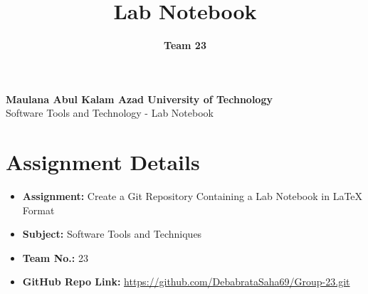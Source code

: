 \documentclass[a4paper,15pt]{article}
\title{\textbf{Lab Notebook}}
\author{\textbf{Team 23}}
\date{}
\begin{document}
\maketitle


\begin{center}
    \Large\textbf{Maulana Abul Kalam Azad University of Technology}\\
    \vspace{0.2cm}
    \large Software Tools and Technology - Lab Notebook
\end{center}

\vspace{1cm}

\section*{Assignment Details}
\begin{itemize}[leftmargin=1.5cm]
    \item \textbf{Assignment:} Create a Git Repository Containing a Lab Notebook in LaTeX Format
    \item \textbf{Subject:} Software Tools and Techniques
    \item \textbf{Team No.:} 23
    \item \textbf{GitHub Repo Link:} \url{https://github.com/DebabrataSaha69/Group-23.git}
\end{itemize}

\vspace{1cm}
\end{document}
